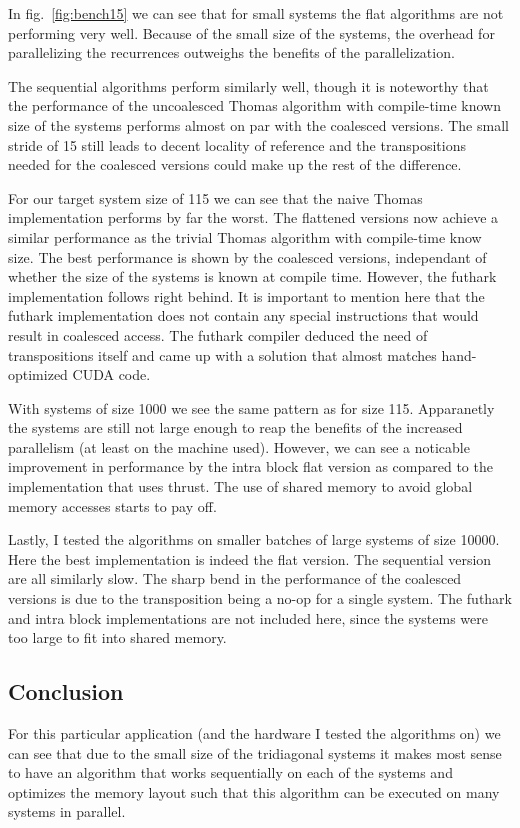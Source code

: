 \documentclass[a4paper,oneside]{memoir}
\begin{document}
In fig.~\ref{fig:bench15} we can see that for small systems the flat algorithms are not performing very well. Because of the small size of the systems, the overhead for parallelizing the recurrences outweighs the benefits of the parallelization.

The sequential algorithms perform similarly well, though it is noteworthy that the performance of the uncoalesced Thomas algorithm with compile-time known size of the systems performs almost on par with the coalesced versions. The small stride of 15 still leads to decent locality of reference and the transpositions needed for the coalesced versions could make up the rest of the difference.

For our target system size of 115 we can see that the naive Thomas implementation performs by far the worst. The flattened versions now achieve a similar performance as the trivial Thomas algorithm with compile-time know size.
The best performance is shown by the coalesced versions, independant of whether the size of the systems is known at compile time. However, the futhark implementation follows right behind. It is important to mention here that the futhark implementation does not contain any special instructions that would result in coalesced access. The futhark compiler deduced the need of transpositions itself and came up with a solution that almost matches hand-optimized CUDA code.

With systems of size 1000 we see the same pattern as for size 115. Apparanetly the systems are still not large enough to reap the benefits of the increased parallelism (at least on the machine used). However, we can see a noticable improvement in performance by the intra block flat version as compared to the implementation that uses thrust. The use of shared memory to avoid global memory accesses starts to pay off.

Lastly, I tested the algorithms on smaller batches of large systems of size 10000. Here the best implementation is indeed the flat version. The sequential version are all similarly slow. The sharp bend in the performance of the coalesced versions is due to the transposition being a no-op for a single system.
The futhark and intra block implementations are not included here, since the systems were too large to fit into shared memory. 

\subsection{Conclusion}
For this particular application (and the hardware I tested the algorithms on) we can see that due to the small size of the tridiagonal systems it makes most sense to have an algorithm that works sequentially on each of the systems and optimizes the memory layout such that this algorithm can be executed on many systems in parallel. 
\end{document}
